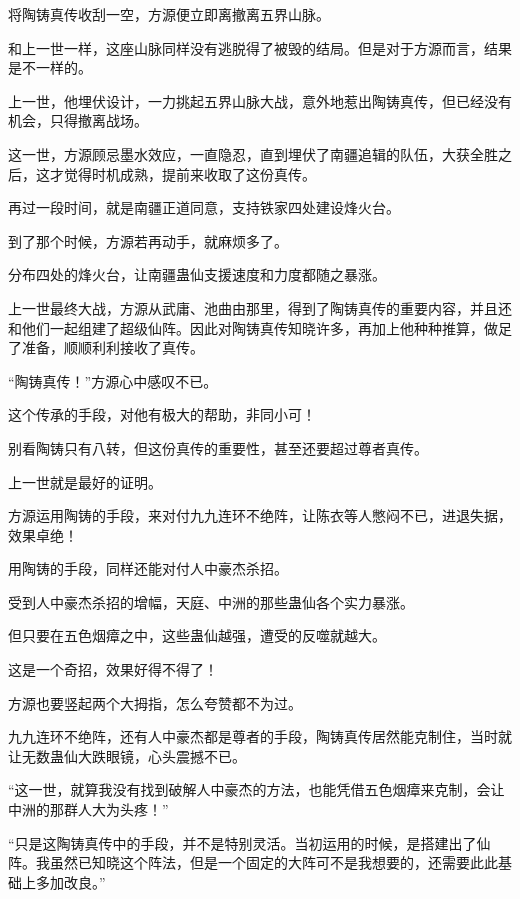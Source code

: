 
\begin{this_body}



将陶铸真传收刮一空，方源便立即离撤离五界山脉。

和上一世一样，这座山脉同样没有逃脱得了被毁的结局。但是对于方源而言，结果是不一样的。

上一世，他埋伏设计，一力挑起五界山脉大战，意外地惹出陶铸真传，但已经没有机会，只得撤离战场。

这一世，方源顾忌墨水效应，一直隐忍，直到埋伏了南疆追辑的队伍，大获全胜之后，这才觉得时机成熟，提前来收取了这份真传。

再过一段时间，就是南疆正道同意，支持铁家四处建设烽火台。

到了那个时候，方源若再动手，就麻烦多了。

分布四处的烽火台，让南疆蛊仙支援速度和力度都随之暴涨。

上一世最终大战，方源从武庸、池曲由那里，得到了陶铸真传的重要内容，并且还和他们一起组建了超级仙阵。因此对陶铸真传知晓许多，再加上他种种推算，做足了准备，顺顺利利接收了真传。

“陶铸真传！”方源心中感叹不已。

这个传承的手段，对他有极大的帮助，非同小可！

别看陶铸只有八转，但这份真传的重要性，甚至还要超过尊者真传。

上一世就是最好的证明。

方源运用陶铸的手段，来对付九九连环不绝阵，让陈衣等人憋闷不已，进退失据，效果卓绝！

用陶铸的手段，同样还能对付人中豪杰杀招。

受到人中豪杰杀招的增幅，天庭、中洲的那些蛊仙各个实力暴涨。

但只要在五色烟瘴之中，这些蛊仙越强，遭受的反噬就越大。

这是一个奇招，效果好得不得了！

方源也要竖起两个大拇指，怎么夸赞都不为过。

九九连环不绝阵，还有人中豪杰都是尊者的手段，陶铸真传居然能克制住，当时就让无数蛊仙大跌眼镜，心头震撼不已。

“这一世，就算我没有找到破解人中豪杰的方法，也能凭借五色烟瘴来克制，会让中洲的那群人大为头疼！”

“只是这陶铸真传中的手段，并不是特别灵活。当初运用的时候，是搭建出了仙阵。我虽然已知晓这个阵法，但是一个固定的大阵可不是我想要的，还需要此此基础上多加改良。”


\end{this_body}
